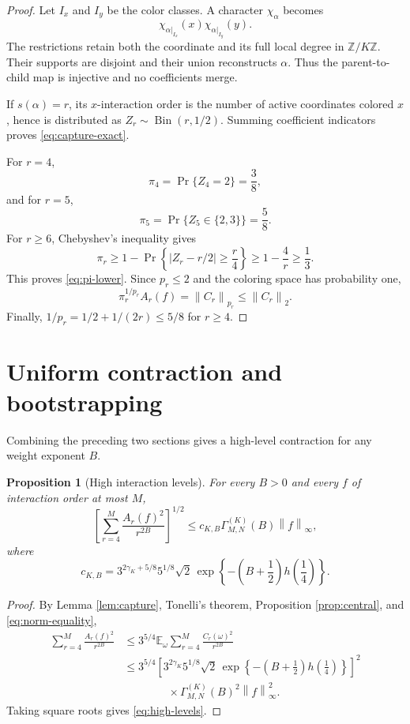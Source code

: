 \documentclass[11pt]{article}
\newtheorem{proposition}[theorem]{Proposition}
\theoremstyle{definition}
\theoremstyle{remark}
\newcommand{\E}{\mathbb{E}}
\newcommand{\Z}{\mathbb{Z}}
\newcommand{\norm}[1]{\left\lVert #1\right\rVert}
\newcommand{\abs}[1]{\left\lvert #1\right\rvert}
\DeclareMathOperator{\Bin}{Bin}
\begin{document}
\begin{proof}
Let $I_x$ and $I_y$ be the color classes.  A character $\chi_\alpha$ becomes
\begin{equation}
\label{eq:split-character}
 \chi_{\alpha|_{I_x}}(x)\chi_{\alpha|_{I_y}}(y).
\end{equation}
The restrictions retain both the coordinate and its full local degree in
$\Z/K\Z$.  Their supports are disjoint and their union reconstructs $\alpha$.
Thus the parent-to-child map is injective and no coefficients merge.

If $s(\alpha)=r$, its $x$-interaction order is the number of active
coordinates colored $x$, hence is distributed as $Z_r\sim\Bin(r,1/2)$.
Summing coefficient indicators proves \eqref{eq:capture-exact}.

For $r=4$,
\[
 \pi_4=\Pr\{Z_4=2\}=\frac38,
\]
and for $r=5$,
\[
 \pi_5=\Pr\{Z_5\in\{2,3\}\}=\frac58.
\]
For $r\ge6$, Chebyshev's inequality gives
\[
 \pi_r
 \ge1-\Pr\left\{\abs{Z_r-r/2}\ge\frac r4\right\}
 \ge1-\frac4r
 \ge\frac13.
\]
This proves \eqref{eq:pi-lower}.  Since $p_r\le2$ and the coloring space has
probability one,
\[
 \pi_r^{1/p_r}A_r(f)
 =\norm{C_r}_{p_r}
 \le\norm{C_r}_2.
\]
Finally, $1/p_r=1/2+1/(2r)\le5/8$ for $r\ge4$.
\end{proof}

\section{Uniform contraction and bootstrapping}
\label{sec:absorption}

Combining the preceding two sections gives a high-level contraction for any
weight exponent $B$.

\begin{proposition}[High interaction levels]
\label{prop:high-levels}
For every $B>0$ and every $f$ of interaction order at most $M$,
\begin{equation}
\label{eq:high-levels}
 \left[
  \sum_{r=4}^M\frac{A_r(f)^2}{r^{2B}}
 \right]^{1/2}
 \le c_{K,B}\Gamma^{(K)}_{M,N}(B)\norm f_\infty,
\end{equation}
where
\begin{equation}
\label{eq:cKB}
 c_{K,B}
 =3^{2\gamma_K+5/8}5^{1/8}\sqrt2\,
 \exp\left\{-\left(B+\frac12\right)
 h\left(\frac14\right)\right\}.
\end{equation}
\end{proposition}

\begin{proof}
By Lemma \ref{lem:capture}, Tonelli's theorem, Proposition
\ref{prop:central}, and \eqref{eq:norm-equality},
\begin{align*}
 \sum_{r=4}^M\frac{A_r(f)^2}{r^{2B}}
 &\le3^{5/4}\E_\omega
 \sum_{r=4}^M\frac{C_r(\omega)^2}{r^{2B}}\\
 &\le3^{5/4}
 \left[
  3^{2\gamma_K}5^{1/8}\sqrt2\,
  \exp\left\{-\left(B+\frac12\right)
  h\left(\frac14\right)\right\}
 \right]^2\\
 &\qquad\qquad\times
 \Gamma^{(K)}_{M,N}(B)^2\norm f_\infty^2.
\end{align*}
Taking square roots gives \eqref{eq:high-levels}.
\end{proof}
\end{document}
